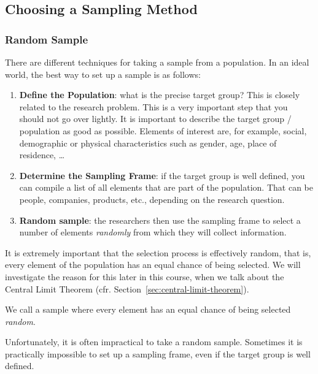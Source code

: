 \subsection{Choosing a Sampling Method}

\subsubsection{Random Sample}

There are different techniques for taking a sample from a population. In an ideal world, the best way to set up a sample is as follows:

\begin{enumerate}
    \item \textbf{Define the Population}: what is the precise target group? This is closely related to the research problem. This is a very important step that you should not go over lightly. It is important to describe the target group / population as good as possible. Elements of interest are, for example, social, demographic or physical characteristics such as gender, age, place of residence, \dots
    \item \textbf{Determine the Sampling Frame}: if the target group is well defined, you can compile a list of all elements that are part of the population. That can be people, companies, products, etc., depending on the research question.
    \item \textbf{Random sample}: the researchers then use the sampling frame to select a number of elements \textit{randomly} from which they will collect information.
\end{enumerate}

It is extremely important that the selection process is effectively random, that is, every element of the population has an equal chance of being selected. We will investigate the reason for this later in this course, when we talk about the Central Limit Theorem (cfr. Section~\ref{sec:central-limit-theorem}).

\begin{definition}
    We call a sample where every element has an equal chance of being selected \emph{random}.
\end{definition}

Unfortunately, it is often impractical to take a random sample. Sometimes it is practically impossible to set up a sampling frame, even if the target group is well defined.

